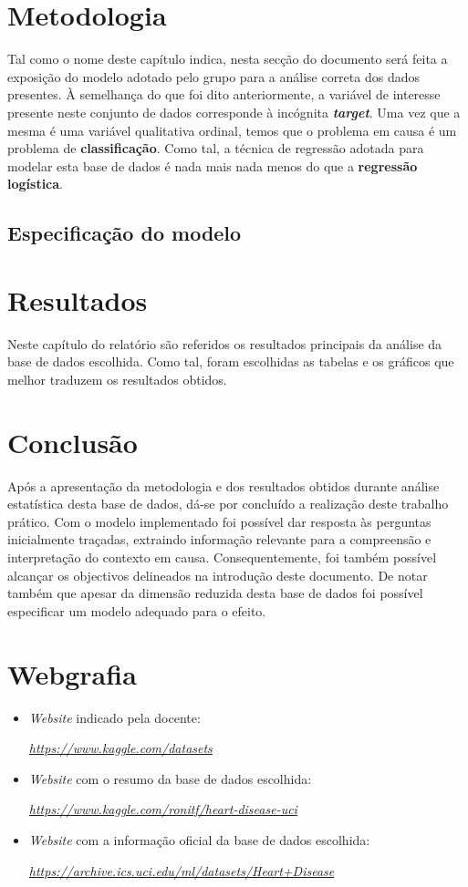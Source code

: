 \documentclass[a4paper]{report}
\begin{document}
\chapter{Metodologia}
\large{
	Tal como o nome deste capítulo indica, nesta secção do documento será feita a exposição do modelo adotado pelo grupo para a análise correta dos dados presentes. À semelhança do que foi dito 
	anteriormente, a variável de interesse presente neste conjunto de dados corresponde à incógnita \textit{\textbf{target}}. Uma vez que a mesma é uma variável qualitativa ordinal, temos que o 
	problema em causa é um problema de \textbf{classificação}. Como tal, a técnica de regressão adotada para modelar esta base de dados é nada mais nada menos do que a \textbf{regressão logística}.

	\section{Especificação do modelo}
}

\chapter{Resultados}
\large{
	Neste capítulo do relatório são referidos os resultados principais da análise da base de dados escolhida. Como tal, foram escolhidas as tabelas e os gráficos que melhor traduzem os resultados
	obtidos.
}

\chapter{Conclusão}
\large{
	Após a apresentação da metodologia e dos resultados obtidos durante análise estatística desta base de dados, dá-se por concluído a realização deste trabalho prático. Com o modelo 
	implementado foi possível dar resposta às perguntas inicialmente traçadas, extraindo informação relevante para a compreensão e interpretação do contexto em causa. Consequentemente, 
	foi também possível alcançar os objectivos delineados na introdução deste documento. De notar também que apesar da dimensão reduzida desta base de dados foi possível especificar um
	modelo adequado para o efeito.
}

\chapter{Webgrafia}
	\begin{itemize}
		\item \textit{Website} indicado pela docente:
		\par \textit{\url{https://www.kaggle.com/datasets}}
        \item \textit{Website} com o resumo da base de dados escolhida:
		\par \textit{\url{https://www.kaggle.com/ronitf/heart-disease-uci}}
		\item \textit{Website} com a informação oficial da base de dados escolhida:
		\par \textit{\url{https://archive.ics.uci.edu/ml/datasets/Heart+Disease}}
    \end{itemize}
\end{document}
